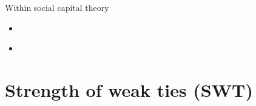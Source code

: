 \documentclass[8pt]{beamer}
\begin{document}

\begin{frame}
\frametitle{\insertsection}

Within social capital theory
    \begin{itemize}
    \item {\color{blue}{Strength of weak ties (SWT)}} \cite{Granovetter1973}
    \item {\color{blue}{Brokerage and structural holes (SH)}} \cite{Burt1992} 
    \end{itemize}
    
\end{frame}





\section{Strength of weak ties (SWT)}

\bgroup
{}
\begin{frame}[plain]{}
\begin{center}
\color{white}{\Huge\insertsection}
\end{center}
\end{frame}
\egroup

\end{document}
